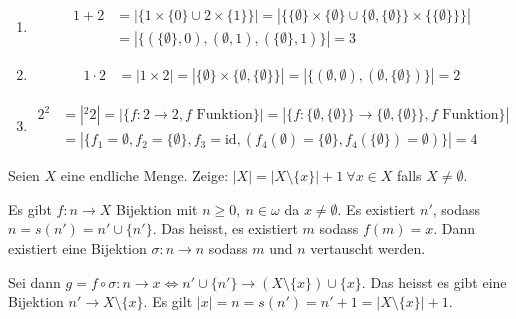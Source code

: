 \documentclass[12pt]{article}
\begin{document}
\begin{proofbox}
    \begin{enumerate}
        \item
        \[
        \begin{aligned}
            1 + 2 &= |\{1\times \{0\} \cup 2 \times \{1\}\}| = |\{\{\emptyset\}\times \{\emptyset\} \cup \{\emptyset, \{\emptyset\}\} \times \{\{\emptyset\}\}\}| \\
            &= |\{(\{\emptyset\}, 0), (\emptyset, 1), (\{\emptyset\}, 1)\}| = 3
        \end{aligned}
        \]

        \item
        \[
        \begin{aligned}
            1 \cdot 2 &= |1 \times 2| = |\{\emptyset\} \times \{\emptyset, \{\emptyset\}\}| = |\{ (\emptyset, \emptyset), (\emptyset, \{\emptyset\}) \}| = 2
        \end{aligned}
        \]

        \item
        \[
        \begin{aligned}
            2^2 &= |{}^2 2| = |\{f: 2 \rightarrow 2, f \text{ Funktion}\}| = |\{f: \{\emptyset, \{\emptyset\}\} \rightarrow \{\emptyset, \{\emptyset\}\}, f \text{ Funktion}\}| \\
            &= |\{ f_1 = \emptyset, f_2 = \{\emptyset\}, f_3 = \mathrm{id}, (f_4(\emptyset) = \{\emptyset\}, f_4(\{\emptyset\}) = \emptyset) \}| = 4
        \end{aligned}
        \]
    \end{enumerate}
\end{proofbox}

\begin{exercise}{}{}
    Seien $X$ eine endliche Menge. Zeige: $|X| = |X \setminus \{x\}| + 1 \ \forall x \in X$ falls $X \neq \emptyset$.
\end{exercise}

\begin{proofbox}
    Es gibt $f: n \rightarrow X$ Bijektion mit $n \geq 0,\ n \in \omega$ da $x \neq \emptyset$. Es existiert $n'$, sodass $n = s(n') = n' \cup \{n'\}$. Das heisst, es existiert $m$ sodass $f(m) = x$. Dann existiert eine Bijektion $\sigma: n \rightarrow n$ sodass $m$ und $n$ vertauscht werden.
    
    Sei dann $g = f \circ \sigma: n \rightarrow x \iff n' \cup \{n'\} \rightarrow (X \setminus \{x\}) \cup \{x\}$. Das heisst es gibt eine Bijektion $n' \rightarrow X \setminus \{x\}$. Es gilt $|x| = n = s(n') = n' + 1 = |X \setminus \{x\}| + 1$.
\end{proofbox}
\end{document}
